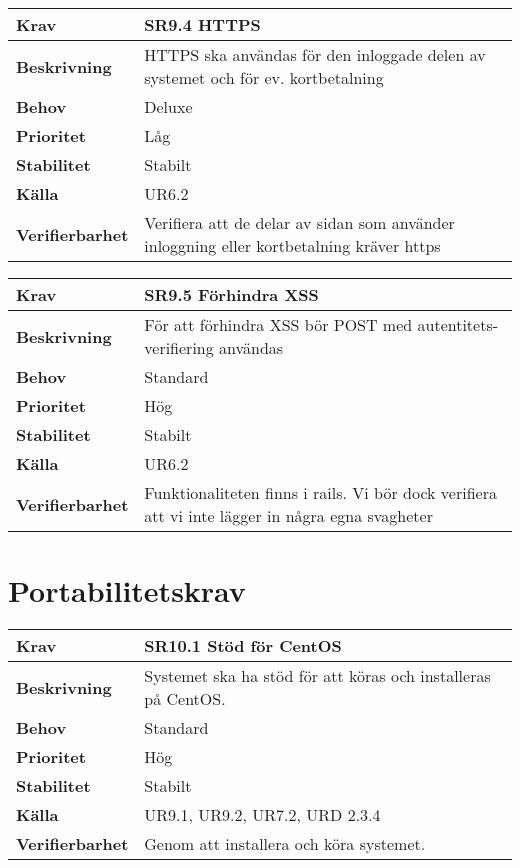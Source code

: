 \documentclass[a4paper, twoside, 11pt, titlepage]{article}
\begin{document}
\begin{tabular} { p{2.6cm} p{12.5cm} }
	\hline
	\sffamily\textbf{Krav} & SR9.4 HTTPS   \\
	\hline
	\sffamily\textbf{Beskrivning} & HTTPS ska användas för den inloggade delen av systemet och för ev. kortbetalning  \\
	\hline
	\sffamily\textbf{Behov} & Deluxe  \\
	\hline
	\sffamily\textbf{Prioritet} & Låg  \\
	\hline
	\sffamily\textbf{Stabilitet} & Stabilt  \\
	\hline
	\sffamily\textbf{Källa} & UR6.2  \\
	\hline
	\sffamily\textbf{Verifierbarhet} & Verifiera att de delar av sidan som använder inloggning eller kortbetalning kräver https  \\
	\hline
\end{tabular}
\vspace{6mm}

\begin{tabular} { p{2.6cm} p{12.5cm} }
	\hline
	\sffamily\textbf{Krav} & SR9.5 Förhindra XSS   \\
	\hline
	\sffamily\textbf{Beskrivning} & För att förhindra XSS bör POST med autentitets-verifiering användas  \\
	\hline
	\sffamily\textbf{Behov} & Standard  \\
	\hline
	\sffamily\textbf{Prioritet} & Hög  \\
	\hline
	\sffamily\textbf{Stabilitet} & Stabilt  \\
	\hline
	\sffamily\textbf{Källa} & UR6.2  \\
	\hline
	\sffamily\textbf{Verifierbarhet} & Funktionaliteten finns i rails. Vi bör dock verifiera att vi inte lägger in några egna svagheter  \\
	\hline
\end{tabular}


\clearpage
\section{Portabilitetskrav}


\begin{tabular} { p{2.6cm} p{12.5cm} }
	\hline
	\sffamily\textbf{Krav} & \sffamily\textbf{SR10.1 Stöd för CentOS } \\
	\hline
	\sffamily\textbf{Beskrivning} & Systemet ska ha stöd för att köras och installeras på CentOS.  \\
	\hline
	\sffamily\textbf{Behov} & Standard  \\
	\hline
	\sffamily\textbf{Prioritet} & Hög  \\
	\hline
	\sffamily\textbf{Stabilitet} & Stabilt  \\
	\hline
	\sffamily\textbf{Källa} & UR9.1, UR9.2, UR7.2, URD 2.3.4  \\
	\hline
	\sffamily\textbf{Verifierbarhet} & Genom att installera och köra systemet.  \\
	\hline
\end{tabular}
\end{document}
